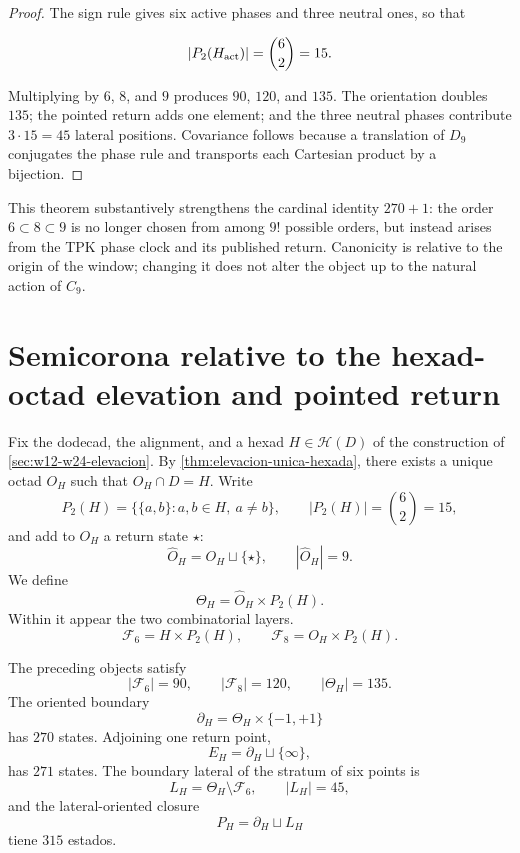 \begin{proof}
The sign rule gives six active phases and three neutral ones, so that

\[
 |P_2(H_{\rm act})|=\binom62=15.
\]

Multiplying by \(6\), \(8\), and \(9\) produces \(90\), \(120\), and \(135\).
The orientation doubles \(135\); the pointed return adds one element; and the
three neutral phases contribute \(3\cdot15=45\) lateral positions.
Covariance follows because a translation of \(D_9\) conjugates the phase rule
and transports each Cartesian product by a bijection.
\end{proof}

This theorem substantively strengthens the cardinal identity \(270+1\): the
order \(6\subset8\subset9\) is no longer chosen from among \(9!\) possible orders,
but instead arises from the TPK phase clock and its published return.
Canonicity is relative to the origin of the window; changing it does not alter the
object up to the natural action of \(C_9\).

\section{Semicorona relative to the hexad-octad elevation and pointed return}

Fix the dodecad, the alignment, and a hexad
\(H\in\mathcal H(D)\) of the construction of
\cref{sec:w12-w24-elevacion}. By
\cref{thm:elevacion-unica-hexada}, there exists a unique octad \(O_H\) such that
\(O_H\cap D=H\). Write
\[
 P_2(H)=\{\{a,b\}:a,b\in H,\ a\ne b\},
 \qquad |P_2(H)|=\binom62=15,
\]
and add to \(O_H\) a return state \(\star\):
\[
 \widehat O_H=O_H\sqcup\{\star\},
 \qquad |\widehat O_H|=9.
\]
We define
\[
 \Theta_H=\widehat O_H\times P_2(H).
\]
Within it appear the two combinatorial layers.
\[
 \mathcal F_6=H\times P_2(H),
 \qquad
 \mathcal F_8=O_H\times P_2(H).
\]

\begin{theorem}
\label{thm:realizacion-semicorona}
The preceding objects satisfy
\[
 |\mathcal F_6|=90,
 \qquad
 |\mathcal F_8|=120,
 \qquad
 |\Theta_H|=135.
\]
The oriented boundary
\[
 \partial_H=\Theta_H\times\{-1,+1\}
\]
has \(270\) states. Adjoining one return point,
\[
 E_H=\partial_H\sqcup\{\infty\},
\]
has \(271\) states. The boundary lateral of the stratum of six points is
\[
 L_H=\Theta_H\setminus\mathcal F_6,
 \qquad |L_H|=45,
\]
and the lateral-oriented closure
\[
 P_H=\partial_H\sqcup L_H
\]
tiene \(315\) estados.
\end{theorem}

